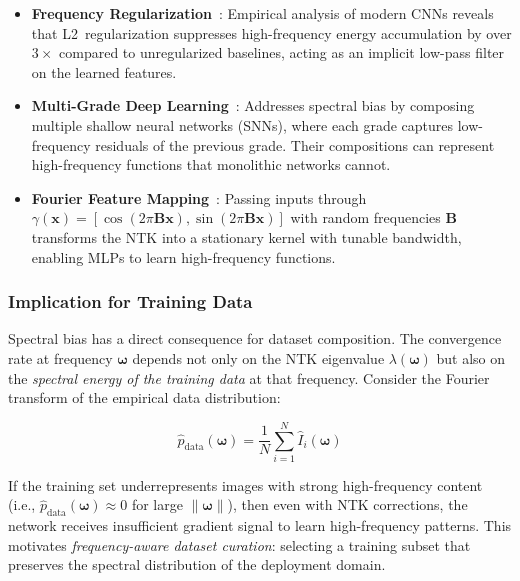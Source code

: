 \begin{itemize}
    \item \textbf{Frequency Regularization}~\cite{freqreg2025}: Empirical
          analysis of modern CNNs reveals that L2~regularization suppresses
          high-frequency energy accumulation by over $3\times$ compared to
          unregularized baselines, acting as an implicit low-pass filter on
          the learned features.

    \item \textbf{Multi-Grade Deep Learning}~\cite{mgdl2024}: Addresses
          spectral bias by composing multiple shallow neural networks (SNNs),
          where each grade captures low-frequency residuals of the previous
          grade.  Their compositions can represent high-frequency functions
          that monolithic networks cannot.

    \item \textbf{Fourier Feature Mapping}~\cite{tancik2020fourier}: Passing
          inputs through $\gamma(\mathbf{x}) = [\cos(2\pi\mathbf{B}\mathbf{x}),
          \sin(2\pi\mathbf{B}\mathbf{x})]$ with random frequencies
          $\mathbf{B}$ transforms the NTK into a stationary kernel with
          tunable bandwidth, enabling MLPs to learn high-frequency functions.
\end{itemize}

\subsubsection{Implication for Training Data}

Spectral bias has a direct consequence for dataset composition.
The convergence rate at frequency $\boldsymbol{\omega}$ depends not only on
the NTK eigenvalue $\lambda(\boldsymbol{\omega})$ but also on the
\emph{spectral energy of the training data} at that frequency.  Consider the
Fourier transform of the empirical data distribution:

\begin{equation}
    \hat{p}_{\text{data}}(\boldsymbol{\omega})
    = \frac{1}{N} \sum_{i=1}^{N}
      \hat{I}_i(\boldsymbol{\omega})
\end{equation}

If the training set underrepresents images with strong high-frequency content
(i.e., $\hat{p}_{\text{data}}(\boldsymbol{\omega}) \approx 0$ for large
$\|\boldsymbol{\omega}\|$), then even with NTK corrections, the network
receives insufficient gradient signal to learn high-frequency patterns.  This
motivates \emph{frequency-aware dataset curation}: selecting a training subset
that preserves the spectral distribution of the deployment domain.


